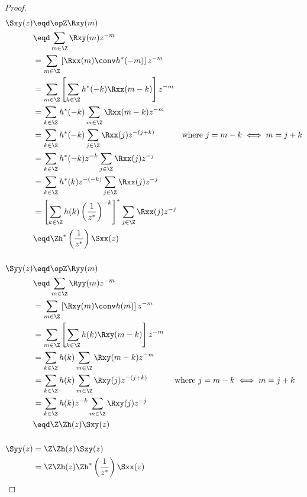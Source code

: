 \begin{proof}
\begin{align*}
  \Sxy(z)
     &\eqd \opZ \Rxy(m)
   \\&\eqd \sum_{m\in\Z}\Rxy(m) z^{-m}
   \\&=    \sum_{m\in\Z}\left[ \Rxx(m) \conv h^\ast(-m) \right] z^{-m}
   \\&=    \sum_{m\in\Z}\left[ \sum_{k\in\Z}h^\ast(-k) \Rxx(m-k)  \right] z^{-m}
   \\&=    \sum_{k\in\Z}h^\ast(-k) \sum_{m\in\Z}\Rxx(m-k)z^{-m}
   \\&=    \sum_{k\in\Z}h^\ast(-k) \sum_{j\in\Z}\Rxx(j)z^{-(j+k)}
           \hspace{3em}\mbox{ where $j=m-k\iff m=j+k$}
   \\&=    \sum_{k\in\Z}h^\ast(-k) z^{-k}   \sum_{j\in\Z}\Rxx(j)z^{-j}
   \\&=    \sum_{k\in\Z}h^\ast(k) z^{-(-k)}   \sum_{j\in\Z}\Rxx(j)z^{-j}
   \\&=    \left[\sum_{k\in\Z}h(k) \left(\frac{1}{z^\ast}\right)^{-k} \right]^\ast  \sum_{j\in\Z}\Rxx(j)z^{-j}
   \\&\eqd \Zh^\ast\left(\frac{1}{z^\ast}\right) \Sxx(z)
\\
\\
   \Syy(z)
     &\eqd \opZ \Ryy(m)
   \\&\eqd \sum_{m\in\Z}\Ryy(m) z^{-m}
   \\&=    \sum_{m\in\Z}\left[ \Rxy(m) \conv h(m) \right] z^{-m}
   \\&=    \sum_{m\in\Z}\left[ \sum_{k\in\Z}h(k) \Rxy(m-k)  \right] z^{-m}
   \\&=    \sum_{k\in\Z}h(k) \sum_{m\in\Z}\Rxy(m-k) z^{-m}
   \\&=    \sum_{k\in\Z}h(k) \sum_{m\in\Z}\Rxy(j) z^{-(j+k)}
           \hspace{3em}\mbox{ where $j=m-k\iff m=j+k$}
   \\&=    \sum_{k\in\Z}h(k)z^{-k}   \sum_{m\in\Z}\Rxy(j) z^{-j}
   \\&\eqd \Z\Zh(z) \Sxy(z)
\\
\\
   \Syy(z)
     &= \Z\Zh(z) \Sxy(z)
   \\&= \Z\Zh(z) \Zh^\ast\left(\frac{1}{z^\ast}\right) \Sxx(z)
\end{align*}
\end{proof}

